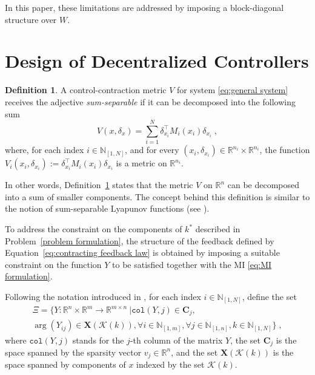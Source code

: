 \documentclass[10pt,twocolumn,twoside]{IEEEtran}
\theoremstyle{plain}
\theoremstyle{definition}
\newtheorem{definition}{Definition}
\theoremstyle{remark}
\begin{document}
In this paper, these limitations are addressed by imposing a block-diagonal structure over $W$.

\section{Design of Decentralized Controllers}\label{sec:Design of Decentralized Controllers}

\begin{definition}\label{def:SSCCM}
	A control-contraction metric $V$ for system \eqref{eq:general system} receives the adjective \emph{sum-separable} if it can be decomposed into the following sum
	\begin{equation*}
		V(x,\delta_x)=\sum_{i=1}^N \delta_{x_i}^\top M_i(x_i)\delta_{x_i}\;,
	\end{equation*}
	where, for each index $i\in\mathbb{N}_{[1,N]}$, and for every $(x_i,\delta_{x_i})\in\mathbb{R}^{n_i}\times\mathbb{R}^{n_i}$, the function $V_i(x_i,\delta_{x_i}):=\delta_{x_i}^\top M_i(x_i)\delta_{x_i}$ is a metric on $\mathbb{R}^{n_i}$.
\end{definition}

In other words, Definition~\ref{def:SSCCM} states that the metric $V$ on $\mathbb{R}^n$ can be  decomposed into a sum of smaller components. The concept behind this definition is similar to the notion of sum-separable Lyapunov functions (see \cite{Dirr2015}). 

To address the constraint on the components of $k^\ast$ described in Problem~\ref{problem formulation}, the structure of the feedback defined by Equation~\eqref{eq:contracting feedback law} is obtained by imposing a suitable constraint on the function $Y$ to be satisfied together with the MI \eqref{eq:MI formulation}. 

Following the notation introduced in \cite{Tanaka2011}, for each index $i\in\mathbb{N}_{[1,N]}$, define the set 
\begin{subequations}
	\begin{align*}
		\Xi=\{Y:\mathbb{R}^n\times\mathbb{R}^m\to\mathbb{R}^{m\times n}\ |\mathbin{\mathtt{col}}(Y,j)\in\mathbf{C}_j,\\
		\arg(Y_{ij})\in\mathbf{X}(\mathscr{K}(k)),\forall i\in\mathbb{N}_{[1,m]},\forall j\in\mathbb{N}_{[1,n]},k\in\mathbb{N}_{[1,N]}\}\;,
	\end{align*}
\end{subequations}
where $\mathbin{\mathtt{col}}(Y,j)$ stands for the $j$-th column of the matrix $Y$, the set $\mathbf{C}_j$ is the space spanned by the sparsity vector $v_j\in\mathbb{R}^{n}$, and the set $\mathbf{X}(\mathscr{K}(k))$ is the space spanned by components of $x$ indexed by the set $\mathscr{K}(k)$.
\end{document}
